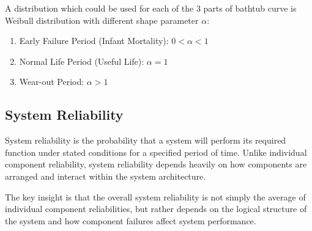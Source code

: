 \documentclass[twoside]{book}
\begin{document}
A distribution which could be used for each of the 3 parts of bathtub curve is Weibull distribution with different shape
parameter $ \alpha $:

\begin{enumerate}
    \item {Early Failure Period (Infant Mortality):} $0<\alpha<1$

    \item {Normal Life Period (Useful Life):} $\alpha=1$

    \item {Wear-out Period:} $\alpha>1$
\end{enumerate}


\subsection{System Reliability}

System reliability is the probability that a system will perform its required function under stated conditions for a specified period of time. Unlike individual component reliability, system reliability depends heavily on how components are arranged and interact within the system architecture.

The key insight is that the overall system reliability is not simply the average of individual component reliabilities, but rather depends on the logical structure of the system and how component failures affect system performance.
\end{document}
